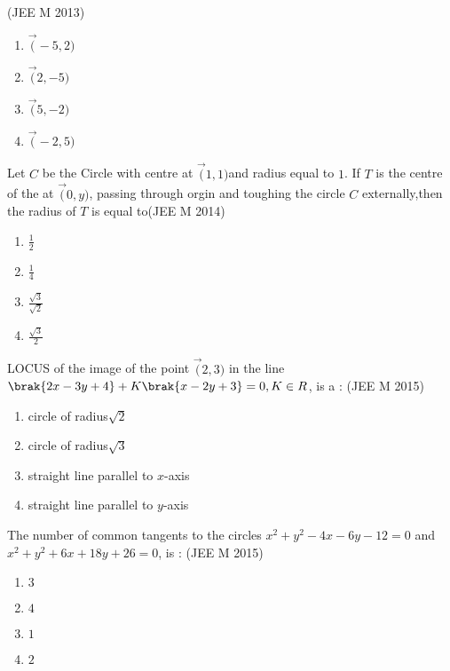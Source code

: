         \hfill(JEE M 2013)
    \begin{enumerate}
         \item$\vec(-5,2)$\\
         \item$\vec(2,-5)$\\
         \item$\vec(5,-2)$\\
         \item$\vec(-2,5)$\\
    \end{enumerate}
        \item Let $C$ be the Circle with centre at $\vec(1,1)$and radius equal to $1$. If $T$ is the centre of the at $\vec(0,y)$, passing through orgin and toughing the circle $C$ externally,then the radius of $T$ is equal to\hfill(JEE M 2014)
    \begin{enumerate}
        \item$\frac{1}{2}$\\
        \item$\frac{1}{4}$\\
        \item$\frac{\sqrt{3}}{\sqrt{2}}$\\
        \item$\frac{\sqrt{3}}{2}$\\
    \end{enumerate}
    \item LOCUS of the image of the point $\vec(2,3)$ in the line $\brak{2x-3y+4}+K\brak{x-2y+3}=0,K\in R$, is a :
        \hfill(JEE M 2015)
    \begin{enumerate}
         \item circle of radius${\sqrt{2}}$\\
         \item circle of radius${\sqrt{3}}$\\
         \item straight line parallel to $x$-axis\\
         \item straight line parallel to $y$-axis\\
    \end{enumerate} 
        \item The number of common tangents to the circles $x^2+y^2-4x-6y-12=0$ and $x^2+y^2+6x+18y+26=0$, is :
         \hfill(JEE M 2015)
    \begin{enumerate}
         \item $3$\\
         \item $4$\\
         \item $1$\\
         \item $2$\\
    \end{enumerate}
